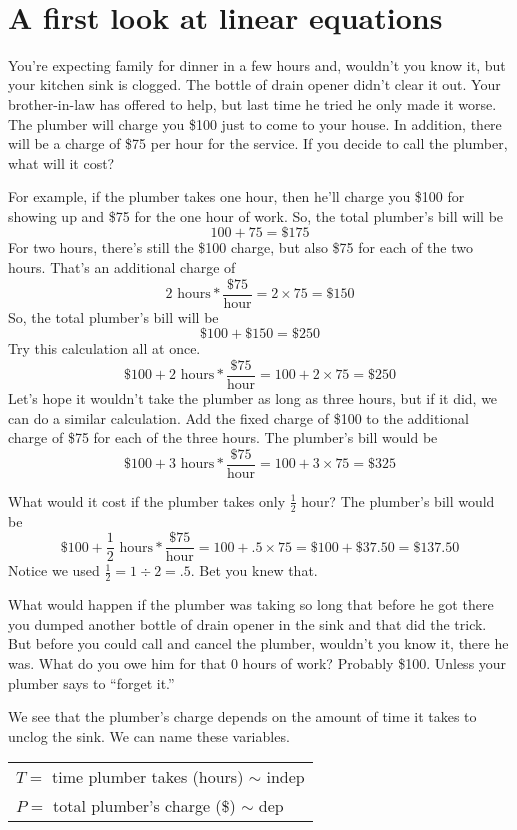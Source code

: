 ~\vspace{.1in}

\section{A first look at linear equations}

You're expecting family for dinner in a few hours and, wouldn't you know it, but your kitchen sink is clogged.  The bottle of drain opener didn't clear it out. Your brother-in-law has offered to help, but last time he tried he only made it worse.  The plumber will charge you \$100 just to come to your house.  In addition, there will be a charge of \$75 per hour for the service.  If you decide to call the plumber, what will it cost?

For example, if the plumber takes one hour, then he'll charge you \$100 for showing up and \$75 for the one hour of work.  So, the total plumber's bill will be 
$$100 + 75 = \$175$$  
For two hours, there's still the \$100 charge, but also \$75 for each of the two hours.  That's an additional charge of 
$$2 \text{ hours} \ast \frac{\$75}{\text{hour}} =2 \times 75= \$150$$  
So, the total plumber's bill will be 
$$\$100 + \$150 = \$250$$
Try this calculation all at once.
$$\$100 + 2 \text{ hours} \ast \frac{\$75}{\text{hour}} = 100 + 2 \times 75 = \$250$$   
Let's hope it wouldn't take the plumber as long as three hours, but if it did, we can do a similar calculation.  Add the fixed charge of \$100 to the additional charge of \$75 for each of the three hours.  The plumber's bill would be 
$$ \$100 + 3 \text{ hours} \ast \frac{\$75}{\text{hour}} = 100 + 3 \times 75 = \$325$$  

What would it cost if the plumber takes only $\frac{1}{2}$ hour?  The plumber's bill would be 
$$\$100 + \frac{1}{2} \text{ hours} \ast \frac{\$75}{\text{hour}} =100 + .5 \times 75  = \$100 + \$37.50 = \$137.50$$  
Notice we used $\frac{1}{2}=1 \div 2 = .5$.  Bet you knew that.

What would happen if the plumber was taking so long that before he got there you dumped another bottle of drain opener in the sink and that did the trick.  But before you could call and cancel the plumber, wouldn't you know it, there he was.  What do you owe him for that 0 hours of work?  Probably \$100.  Unless your plumber says to  ``forget it.''  

We see that the plumber's charge depends on the amount of time it takes to unclog the sink.  We can name these variables.
\begin{center}
\begin{tabular} {l} 
$T=$ time plumber takes (hours) $\sim$ indep \\
$P= $ total plumber's charge (\$) $\sim$ dep \\ 
\end{tabular}
\end{center}

